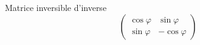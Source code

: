 Matrice inversible d'inverse
\begin{displaymath}
  \begin{pmatrix}
  \cos \varphi & \sin \varphi \\
  \sin \varphi & -\cos \varphi
\end{pmatrix}
\end{displaymath}
